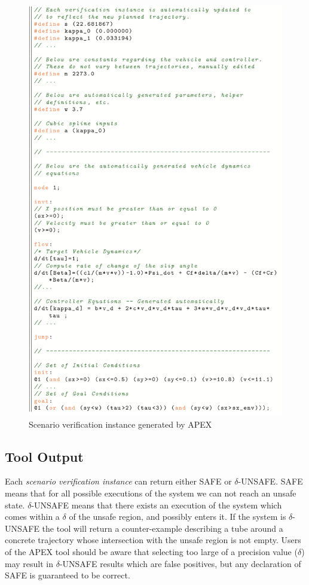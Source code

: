 \begin{figure}
	\centering
	\includegraphics[width=\columnwidth]{figures/code}
	\caption{Scenario verification instance generated by APEX}
	\label{fig:scenario_ver}
\end{figure}

\subsection{Tool Output}
Each \emph{scenario verification instance} can  return either SAFE or $\delta$-UNSAFE. SAFE means that for all possible executions of the system we can not reach an unsafe state.
$\delta$-UNSAFE means that there exists an execution of the system which comes within a $\delta$ of the unsafe region, and possibly enters it. If the system is $\delta$-UNSAFE the tool will return a counter-example describing a tube around a concrete trajectory whose intersection with the unsafe region is not empty. Users of the APEX tool should be aware that selecting too large of a precision value ($\delta$) may result in $\delta$-UNSAFE results which are false positives, but any declaration of SAFE is guaranteed to be correct. 